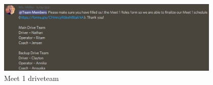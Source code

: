 \begin{figure}[htp]
\centering
\includegraphics[width=0.95\textwidth, angle=0]{Meetings/November/11-04-21/11-4-21_Team_Figure3 - Nathan Forrer.JPG}
\caption{Meet 1 driveteam}
\label{fig:110421_3}
\end{figure}


